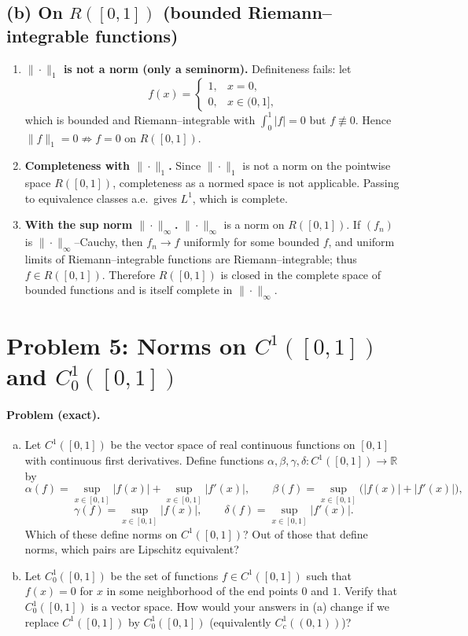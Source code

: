 \documentclass[12pt,a4paper]{article}
\theoremstyle{plain}
\theoremstyle{definition}
\theoremstyle{remark}
\theoremstyle{remark}
\begin{document}
\subsection*{(b) On $R([0,1])$ (bounded Riemann–integrable functions)}
\begin{enumerate}[1)]
	\item \textbf{$\|\cdot\|_{1}$ is not a norm (only a seminorm).}
	Definiteness fails: let
	\[
	f(x)=\begin{cases}
		1, & x=0,\\
		0, & x\in (0,1],
	\end{cases}
	\]
	which is bounded and Riemann–integrable with $\int_{0}^{1}|f|=0$ but $f\not\equiv 0$.
	Hence $\|f\|_{1}=0\not\Rightarrow f=0$ on $R([0,1])$.
	
	\item \textbf{Completeness with $\|\cdot\|_{1}$.}
	Since $\|\cdot\|_{1}$ is not a norm on the pointwise space $R([0,1])$, completeness as a normed space
	is not applicable. Passing to equivalence classes a.e.\ gives $L^{1}$, which is complete.
	
	\item \textbf{With the sup norm $\|\cdot\|_{\infty}$.}
	$\|\cdot\|_{\infty}$ is a norm on $R([0,1])$. If $(f_n)$ is $\|\cdot\|_{\infty}$–Cauchy, then
	$f_n\to f$ uniformly for some bounded $f$, and uniform limits of Riemann–integrable functions are
	Riemann–integrable; thus $f\in R([0,1])$. Therefore $R([0,1])$ is closed in the complete space of bounded
	functions and is itself complete in $\|\cdot\|_{\infty}$.
\end{enumerate}



\section*{Problem 5: Norms on $C^1([0,1])$ and $C^1_0([0,1])$}


\paragraph{Problem (exact).}
\begin{enumerate}[(a)]
	\item Let $C^{1}([0,1])$ be the vector space of real continuous functions on $[0,1]$ with
	continuous first derivatives. Define functions $\alpha,\beta,\gamma,\delta:C^{1}([0,1])\to\mathbb{R}$ by
	\[
	\alpha(f)=\sup_{x\in[0,1]}|f(x)|+\sup_{x\in[0,1]}|f'(x)|,\qquad
	\beta(f)=\sup_{x\in[0,1]} \big(|f(x)|+|f'(x)|\big),
	\]
	\[
	\gamma(f)=\sup_{x\in[0,1]}|f(x)|,\qquad
	\delta(f)=\sup_{x\in[0,1]}|f'(x)|.
	\]
	Which of these define norms on $C^{1}([0,1])$?
	Out of those that define norms, which pairs are Lipschitz equivalent?
	
	\item Let $C^{1}_{0}([0,1])$ be the set of functions $f\in C^{1}([0,1])$ such that
	$f(x)=0$ for $x$ in some neighborhood of the end points $0$ and $1$. Verify that
	$C^{1}_{0}([0,1])$ is a vector space. How would your answers in (a) change if we replace
	$C^{1}([0,1])$ by $C^{1}_{0}([0,1])$ (equivalently $C^{1}_{c}((0,1))$)?
\end{enumerate}
\end{document}
